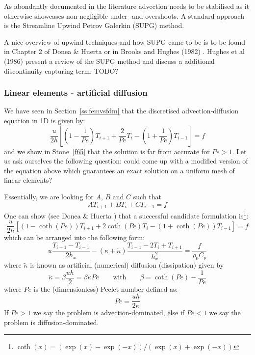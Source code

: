 As abondantly documented in the literature advection needs to be stabilised
as it otherwise showcases non-negligible under- and overshoots.
A standard approach is the Streamline Upwind Petrov Galerkin (SUPG) method.

A nice overview of upwind techniques and how SUPG came to be is to be found in Chapter 
2 of Donea \& Huerta \cite{dohu03} or in Brooks and Hughes (1982) \cite{brhu82}.
Hughes et al (1986) \cite{humm86} present a review of the SUPG method 
and discuss a additional discontinuity-capturing term. TODO? 







\subsubsection{Linear elements - artificial diffusion}

We have seen in Section~\ref{ss:femvsfdm} that the discretised advection-diffusion equation 
in 1D is given by:
\[
\frac{u}{2h}
\left[
\left(1-\frac{1}{Pe}\right) T_{i+1} + \frac{2}{Pe} T_i - \left(1+\frac{1}{Pe}\right)T_{i-1} 
\right] = f
\]
and we show in Stone~\ref{f65} that the solution is far from accurate for $Pe>1$. Let us ask ourselves the 
following question: could come up with a modified version of the equation above which 
guarantees an exact solution on a uniform mesh of linear elements?

Essentially, we are looking for $A$, $B$ and $C$ such that 
\[
A T_{i+1} + BT_i + C T_{i-1} = f
\]
One can show (see Donea \& Huerta \cite{dohu03}) that a successful candidate formulation 
is\footnote{$\coth(x)=(\exp(x)-\exp(-x))/(\exp(x)+\exp(-x))$}:
\[
\frac{u}{2h}
\left[
\left(1-\coth(Pe) \right) T_{i+1} + 2 \coth(Pe) T_i - \left(1+\coth(Pe)\right) T_{i-1} 
\right] = f
\]
which can be arranged into the following form:
\begin{equation}
u
\frac{T_{i+1}-T_{i-1}}{2h_x}
-
(\kappa+ \tilde{\kappa})
\frac{T_{i-1}-2T_i+T_{i+1}}{h_x^2}
= \frac{f}{\rho_0 C_p}
\end{equation}
where 
$\tilde{\kappa}$ is known as artificial (numerical) diffusion (dissipation) given by
\[
\tilde{\kappa}=\beta \frac{u h}{2} = \beta \kappa Pe
\qquad
\text{with}
\qquad
\beta = \coth (Pe) - \frac{1}{Pe}
\]
where $Pe$ is the (dimensionless) Peclet number defined as: 
\[
\boxed{
Pe= \frac{u h }{2 \kappa}
}
\]
If $Pe>1$ we say the problem is advection-dominated, 
else if $Pe<1$ we say the problem is diffusion-dominated.

